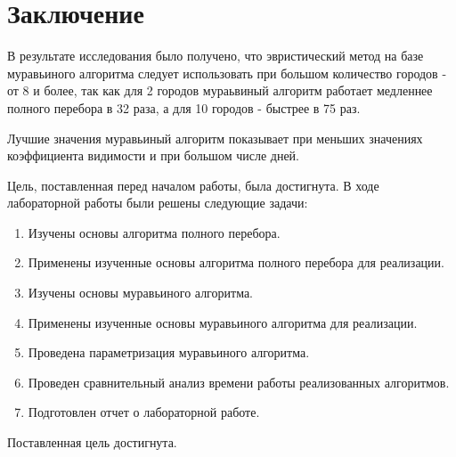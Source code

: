 \chapter*{Заключение}

В результате исследования было получено, что эвристический метод на базе муравьиного алгоритма следует использовать при большом количество городов - от 8 и более, так как для 2 городов мураьвиный алгоритм работает медленнее полного перебора в 32 раза, а для 10 городов - быстрее в 75 раз.

Лучшие значения муравьиный алгоритм показывает при меньших значениях коэффициента видимости и при большом числе дней.

Цель, поставленная перед началом работы, была достигнута. В ходе лабораторной работы были решены следующие задачи:

\begin{enumerate}
	\item Изучены основы алгоритма полного перебора.
	\item Применены изученные основы алгоритма полного перебора для реализации.
	\item Изучены основы муравьиного алгоритма.
	\item Применены изученные основы муравьиного алгоритма для реализации.
	\item Проведена параметризация муравьиного алгоритма.
	\item Проведен сравнительный анализ времени работы реализованных
	алгоритмов.
	\item Подготовлен отчет о лабораторной работе.
\end{enumerate}

Поставленная цель достигнута.
